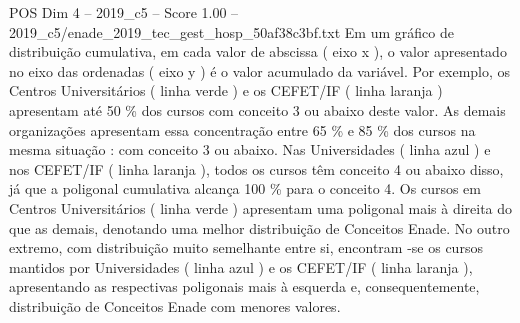 \begin{textsample}{POS Dim 4 – 2019\_c5 – Score 1.00 – 2019\_c5/enade\_2019\_tec\_gest\_hosp\_50af38c3bf.txt}
Em um gráfico de distribuição cumulativa, em cada valor de abscissa ( eixo x ), o valor apresentado no eixo das ordenadas ( eixo y ) é o valor acumulado da variável.
Por exemplo, os Centros Universitários ( linha verde ) e os CEFET/IF ( linha laranja ) apresentam até 50 \% dos cursos com conceito 3 ou abaixo deste valor.
As demais organizações apresentam essa concentração entre 65 \% e 85 \% dos cursos na mesma situação : com conceito 3 ou abaixo.
Nas Universidades ( linha azul ) e nos CEFET/IF ( linha laranja ), todos os cursos têm conceito 4 ou abaixo disso, já que a poligonal cumulativa alcança 100 \% para o conceito 4.
Os cursos em Centros Universitários ( linha verde ) apresentam uma poligonal mais à direita do que as demais, denotando uma melhor distribuição de Conceitos Enade.
No outro extremo, com distribuição muito semelhante entre si, encontram -se os cursos mantidos por Universidades ( linha azul ) e os CEFET/IF ( linha laranja ), apresentando as respectivas poligonais mais à esquerda e, consequentemente, distribuição de Conceitos Enade com menores valores.

\end{textsample}
